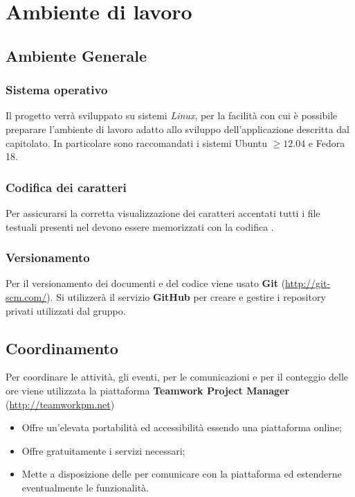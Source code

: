 \section{Ambiente di lavoro}
	
	\subsection{Ambiente Generale}
		
		\subsubsection{Sistema operativo}
		
		Il progetto verrà sviluppato su sistemi \emph{Linux}, per la facilità con cui è possibile preparare l'ambiente di lavoro adatto allo sviluppo dell'applicazione descritta dal capitolato. In particolare sono raccomandati i sistemi Ubuntu $\geq 12.04$ e Fedora 18.
		
		\subsubsection{Codifica dei caratteri}
		
		Per assicurarsi la corretta visualizzazione dei caratteri accentati tutti i file testuali presenti nel  devono essere memorizzati con la codifica .
		
		\subsubsection{Versionamento}
		
		Per il versionamento dei documenti e del codice viene usato \textbf{Git} (\url{http://git-scm.com/}).
		Si utilizzerà il servizio \textbf{GitHub} per creare e gestire i repository privati utilizzati dal gruppo.
		
	\subsection{Coordinamento}
		
		Per coordinare le attività, gli eventi, per le comunicazioni e per il conteggio delle ore viene utilizzata la piattaforma \textbf{Teamwork Project Manager} (\url{http://teamworkpm.net})
		\begin{itemize}
			\item Offre un'elevata portabilità ed accessibilità essendo una piattaforma online;
			\item Offre gratuitamente i servizi necessari;
			\item Mette a disposizione delle  per comunicare con la piattaforma ed estenderne eventualmente le funzionalità.
		\end{itemize}
		
